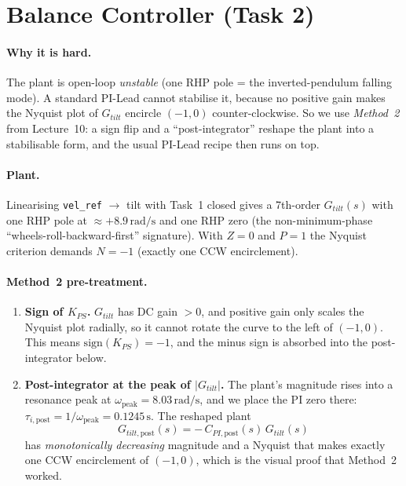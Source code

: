 \section{Balance Controller (Task 2)}
\label{sec:balance}

\paragraph{Why it is hard.} The plant is open-loop \emph{unstable} (one RHP pole = the inverted-pendulum falling mode). A standard PI-Lead cannot stabilise it, because no positive gain makes the Nyquist plot of $G_{tilt}$ encircle $(-1,0)$ counter-clockwise. So we use \emph{Method~2} from Lecture~10: a sign flip and a ``post-integrator'' reshape the plant into a stabilisable form, and the usual PI-Lead recipe then runs on top.

\paragraph{Plant.} Linearising \texttt{vel\_ref} $\to$ tilt with Task~1 closed gives a 7th-order $G_{tilt}(s)$ with one RHP pole at $\approx +8.9\,\mathrm{rad/s}$ and one RHP zero (the non-minimum-phase ``wheels-roll-backward-first'' signature). With $Z = 0$ and $P = 1$ the Nyquist criterion demands $N = -1$ (exactly one CCW encirclement).

\paragraph{Method~2 pre-treatment.}
\begin{enumerate}[leftmargin=*,nosep,label=\textbf{M\arabic*.}]
    \item \textbf{Sign of $K_{PS}$.} $G_{tilt}$ has DC gain $> 0$, and positive gain only scales the Nyquist plot radially, so it cannot rotate the curve to the left of $(-1,0)$. This means $\text{sign}(K_{PS}) = -1$, and the minus sign is absorbed into the post-integrator below.
    \item \textbf{Post-integrator at the peak of $|G_{tilt}|$.} The plant's magnitude rises into a resonance peak at $\omega_{\mathrm{peak}} = 8.03\,\mathrm{rad/s}$, and we place the PI zero there: $\tau_{i,\mathrm{post}} = 1/\omega_{\mathrm{peak}} = 0.1245\,\mathrm{s}$. The reshaped plant
    \[
        G_{tilt,\mathrm{post}}(s) = -\,C_{PI,\mathrm{post}}(s)\,G_{tilt}(s)
    \]
    has \emph{monotonically decreasing} magnitude and a Nyquist that makes exactly one CCW encirclement of $(-1,0)$, which is the visual proof that Method~2 worked.
\end{enumerate}

